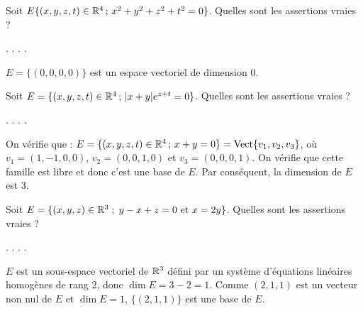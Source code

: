 \begin{question}
Soit $E \{(x,y,z,t) \in \mathbb{R}^4 \, ; \, x^2+y^2 +z^2+t^2=0\}$. Quelles sont les assertions vraies ?
\begin{answers}  
.
.
.
.
\end{answers}
\begin{explanations} $E=\{(0,0,0,0)\}$ est un espace vectoriel de dimension $0$.
\end{explanations}
\end{question}

\begin{question}
Soit $E=\{(x,y,z,t) \in \mathbb{R}^4 \, ; \, |x+y|e^{z+t}=0\}$. Quelles sont les assertions vraies ?
\begin{answers}  
.
.
.
.
\end{answers}
\begin{explanations} On vérifie que : $E=\{(x,y,z,t) \in \mathbb{R}^4 \, ; \, x+y=0\}=\mbox {Vect} \{v_1,v_2,v_3\}$, où $v_1=(1,-1,0,0)$, $v_2=(0,0,1,0)$ et $v_3=(0,0,0,1)$. On vérifie que cette famille est libre et donc c'est une base de $E$. Par conséquent, la dimension de $E$ est $3$.
\end{explanations}
\end{question}


\begin{question}
Soit $E=\{(x,y,z) \in \mathbb{R}^3\; ;\; y-x+z=0\mbox{ et }x=2y\}$. 
Quelles sont les assertions vraies ?
\begin{answers}  
.
.
.
.
\end{answers}
\begin{explanations} $E$ est un sous-espace vectoriel de $  \mathbb{R}^3$ défini par  un système d'équations linéaires homogènes de rang $2$, donc $\dim E= 3-2=1$. Comme $(2,1,1)$ est un vecteur non nul de $E$ et $\dim E=1$, $\{(2,1,1)\}$ est une base de $E$.
\end{explanations}
\end{question}

